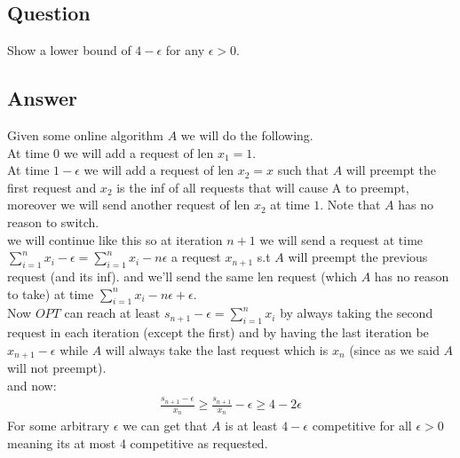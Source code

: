 \subsection*{Question}
Show a lower bound of $4 - \epsilon$ for any $\epsilon > 0$.

\subsection*{Answer}
Given some online algorithm $A$ we will do the following.\\
At time 0 we will add a request of len $x_1=1$.\\
At time $1-\epsilon$ we will add a request of len $x_2=x$ such that $A$ will preempt the first request and $x_2$ is the inf of all requests that will cause A to preempt, moreover we will send another request of len $x_2$ at time $1$. Note that $A$ has no reason to switch.\\
we will continue like this so at iteration $n+1$ we will send a request at time $ \sum_{i=1}^{n} x_i - \epsilon = \sum_{i=1}^{n} x_i - n\epsilon$ a request $x_{n+1}$ s.t $A$ will preempt the previous request (and its inf). and we'll send the same len request (which $A$ has no reason to take) at time $\sum_{i=1}^{n} x_i - n\epsilon + \epsilon$.\\
Now $OPT$ can reach at least $s_{n+1} - \epsilon = \sum_{i=1}^{n} x_i$ by always taking the second request in each iteration (except the first) and by having the last iteration be $x_{n+1} - \epsilon$ while $A$ will always take the last request which is $x_n$ (since as we said $A$ will not preempt).\\
and now:
\begin{gather*}
    \frac{s_{n+1} - \epsilon}{x_n}\geq \frac{s_{n+1}}{x_n} - \epsilon \geq 4 - 2\epsilon
\end{gather*}
For some arbitrary $\epsilon$ we can get that $A$ is at least $4-\epsilon$ competitive for all $\epsilon > 0$ meaning its at most 4 competitive as requested.